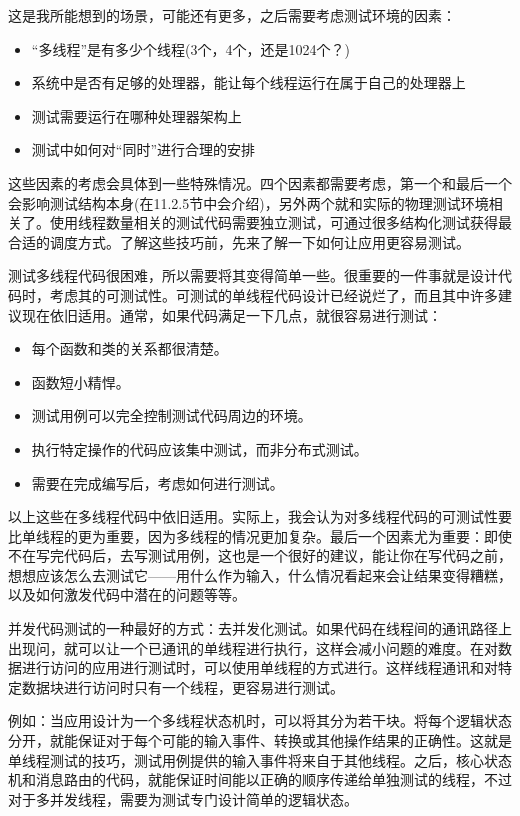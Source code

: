 这是我所能想到的场景，可能还有更多，之后需要考虑测试环境的因素：

\begin{itemize}
    \item “多线程”是有多少个线程(3个，4个，还是1024个？)
    \item 系统中是否有足够的处理器，能让每个线程运行在属于自己的处理器上
    \item 测试需要运行在哪种处理器架构上
    \item 测试中如何对“同时”进行合理的安排
\end{itemize}

这些因素的考虑会具体到一些特殊情况。四个因素都需要考虑，第一个和最后一个会影响测试结构本身(在11.2.5节中会介绍)，另外两个就和实际的物理测试环境相关了。使用线程数量相关的测试代码需要独立测试，可通过很多结构化测试获得最合适的调度方式。了解这些技巧前，先来了解一下如何让应用更容易测试。


测试多线程代码很困难，所以需要将其变得简单一些。很重要的一件事就是设计代码时，考虑其的可测试性。可测试的单线程代码设计已经说烂了，而且其中许多建议现在依旧适用。通常，如果代码满足一下几点，就很容易进行测试：

\begin{itemize}
    \item 每个函数和类的关系都很清楚。
    \item 函数短小精悍。
    \item 测试用例可以完全控制测试代码周边的环境。
    \item 执行特定操作的代码应该集中测试，而非分布式测试。
    \item 需要在完成编写后，考虑如何进行测试。
\end{itemize}

以上这些在多线程代码中依旧适用。实际上，我会认为对多线程代码的可测试性要比单线程的更为重要，因为多线程的情况更加复杂。最后一个因素尤为重要：即使不在写完代码后，去写测试用例，这也是一个很好的建议，能让你在写代码之前，想想应该怎么去测试它——用什么作为输入，什么情况看起来会让结果变得糟糕，以及如何激发代码中潜在的问题等等。

并发代码测试的一种最好的方式：去并发化测试。如果代码在线程间的通讯路径上出现问，就可以让一个已通讯的单线程进行执行，这样会减小问题的难度。在对数据进行访问的应用进行测试时，可以使用单线程的方式进行。这样线程通讯和对特定数据块进行访问时只有一个线程，更容易进行测试。

例如：当应用设计为一个多线程状态机时，可以将其分为若干块。将每个逻辑状态分开，就能保证对于每个可能的输入事件、转换或其他操作结果的正确性。这就是单线程测试的技巧，测试用例提供的输入事件将来自于其他线程。之后，核心状态机和消息路由的代码，就能保证时间能以正确的顺序传递给单独测试的线程，不过对于多并发线程，需要为测试专门设计简单的逻辑状态。

